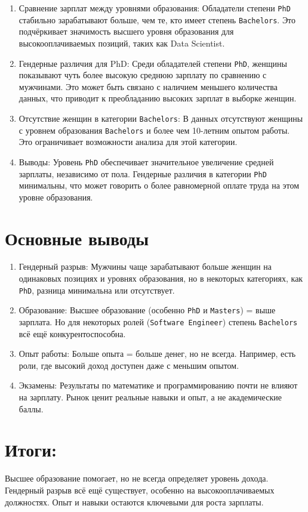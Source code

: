 \documentclass[
]{article}
\begin{document}
\begin{enumerate}
\def\labelenumi{\arabic{enumi}.}
\item
  Сравнение зарплат между уровнями образования: Обладатели степени
  \texttt{PhD} стабильно зарабатывают больше, чем те, кто имеет степень
  \texttt{Bachelor\textquotesingle{}s}. Это подчёркивает значимость
  высшего уровня образования для высокооплачиваемых позиций, таких как
  Data Scientist.
\item
  Гендерные различия для PhD: Среди обладателей степени \texttt{PhD},
  женщины показывают чуть более высокую среднюю зарплату по сравнению с
  мужчинами. Это может быть связано с наличием меньшего количества
  данных, что приводит к преобладанию высоких зарплат в выборке женщин.
\item
  Отсутствие женщин в категории \texttt{Bachelor\textquotesingle{}s}: В
  данных отсутствуют женщины с уровнем образования
  \texttt{Bachelor\textquotesingle{}s} и более чем 10-летним опытом
  работы. Это ограничивает возможности анализа для этой категории.
\item
  Выводы: Уровень \texttt{PhD} обеспечивает значительное увеличение
  средней зарплаты, независимо от пола. Гендерные различия в категории
  \texttt{PhD} минимальны, что может говорить о более равномерной оплате
  труда на этом уровне образования.
\end{enumerate}

\section{Основные
выводы}\label{ux43eux441ux43dux43eux432ux43dux44bux435-ux432ux44bux432ux43eux434ux44b}

\begin{enumerate}
\def\labelenumi{\arabic{enumi}.}
\item
  Гендерный разрыв: Мужчины чаще зарабатывают больше женщин на
  одинаковых позициях и уровнях образования, но в некоторых категориях,
  как \texttt{PhD}, разница минимальна или отсутствует.
\item
  Образование: Высшее образование (особенно \texttt{PhD} и
  \texttt{Master\textquotesingle{}s}) = выше зарплата. Но для некоторых
  ролей (\texttt{Software\ Engineer}) степень
  \texttt{Bachelor\textquotesingle{}s} всё ещё конкурентоспособна.
\item
  Опыт работы: Больше опыта = больше денег, но не всегда. Например, есть
  роли, где высокий доход доступен даже с меньшим опытом.
\item
  Экзамены: Результаты по математике и программированию почти не влияют
  на зарплату. Рынок ценит реальные навыки и опыт, а не академические
  баллы.
\end{enumerate}

\section{Итоги:}\label{ux438ux442ux43eux433ux438}

Высшее образование помогает, но не всегда определяет уровень дохода.
Гендерный разрыв всё ещё существует, особенно на высокооплачиваемых
должностях. Опыт и навыки остаются ключевыми для роста зарплаты.
\end{document}
